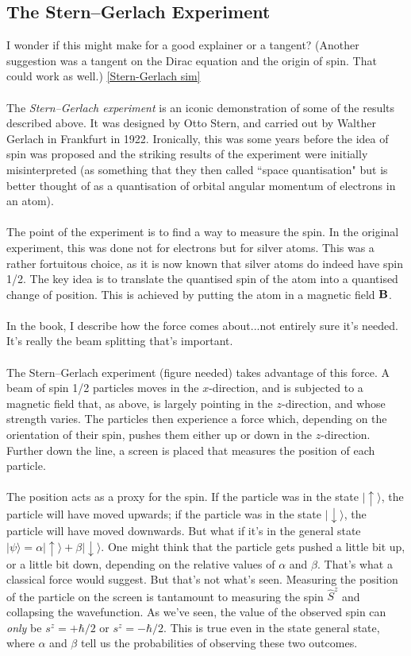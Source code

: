 \documentclass[12pt]{article}
\newcommand\para{\paragraph{}}
\newcommand{\ket}[1]{|#1\rangle}
\newcommand{\cblue}{\color{blue}}
\newcommand{\upket}{|\uparrow\rangle}
\newcommand{\downket}{|\downarrow\rangle}
\begin{document}
{\subsection{The Stern--Gerlach Experiment}

{\cblue I wonder if this might make for a good explainer or a tangent? (Another suggestion was a tangent on the Dirac equation and the origin of spin. That could work as well.) \href{https://capacity-simulations.github.io/simulations/Sims-v2/stern-gerlach.html}{[Stern-Gerlach sim]}

\para
The {\it Stern--Gerlach experiment} is an iconic demonstration of some of the results described above. It was designed by Otto Stern, and carried out by Walther Gerlach in Frankfurt in 1922. Ironically, this was some years before the idea of spin was proposed and the striking results of the experiment were initially misinterpreted (as something that they then called ``space quantisation" but is better thought of as a quantisation of orbital angular momentum of electrons in an atom).

\para
The point of the experiment is to find a way to measure the spin. In the original experiment,  this was done not for electrons but for silver atoms. This was a  rather fortuitous choice, as it is now known that silver atoms do indeed have spin 1/2. The key idea is to translate the quantised spin of the atom into a quantised change of position.  This is achieved by putting the atom in a magnetic field ${\bf B}$.



\para
In the book, I describe how the force comes about...not entirely sure it's needed. It's really the beam splitting that's important.




\para
The Stern--Gerlach experiment (figure needed)  takes advantage of this force. A beam of spin 1/2 particles moves in the $x$-direction, and is subjected to a magnetic field that, as above, is largely pointing in the $z$-direction, and whose strength varies.  The particles then experience a force which, depending on the orientation of their spin, pushes them either up or down in the $z$-direction. Further down the line, a screen is placed that measures the position of each particle. 





\para
The  position acts as a proxy for the spin. If the particle was in the state $\upket$, the particle will have moved upwards; if the particle was in the state $\downket$, the particle will have moved downwards. But what if it's in the general state $\ket{\psi} = \alpha\upket + \beta\downket$.  One might think that the particle gets pushed a little bit up, or a little bit down, depending on the relative values of $\alpha$ and $\beta$. That's what a classical force would suggest. But that's not what's seen.  Measuring the position of the particle on the screen is tantamount to measuring the spin $\hat{S}^z$ and collapsing the wavefunction. As we've seen, the value of the observed spin can {\it only} be $s^z=+\hbar/2$ or $s^z=-\hbar/2$. This is true even in the state general state,  where $\alpha$ and $\beta$ tell us the probabilities of observing these two outcomes. 

}}
\end{document}
